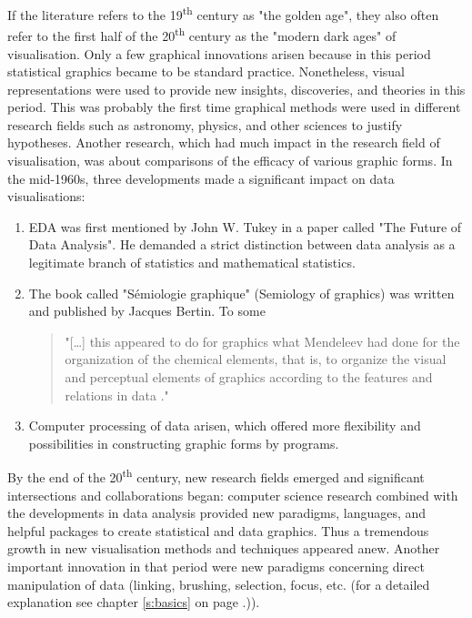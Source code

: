 If the literature refers to the 19\textsuperscript{th} century as "the golden age", they also often refer to the first half of the 20\textsuperscript{th} century as the "modern dark ages" of visualisation. Only a few graphical innovations arisen because in this period statistical graphics became to be standard practice. Nonetheless, visual representations were used to provide new insights, discoveries, and theories in this period. This was probably the first time graphical methods were used in different research fields such as astronomy, physics, and other sciences to justify hypotheses. Another research, which had much impact in the research field of visualisation, was about comparisons of the efficacy of various graphic forms. In the mid-1960s, three developments made a significant impact on data visualisations:
\begin{enumerate}
\item \ac{EDA} was first mentioned by John W. Tukey in a paper called "The Future of Data Analysis". He demanded a strict distinction between data analysis as a legitimate branch of statistics and mathematical statistics.
\item The book called "Sémiologie graphique" (Semiology of graphics) was written and published by Jacques Bertin. To some
\begin{quote}
"[\ldots] this appeared to do for graphics what Mendeleev had done for the organization of the chemical elements, that is, to organize the visual and perceptual elements of graphics according to the features and relations in data ."
\end{quote}
\label{crossref:bertain}
\item Computer processing of data arisen, which offered more flexibility and possibilities in constructing graphic forms by programs.
\end{enumerate}

By the end of the 20\textsuperscript{th} century, new research fields emerged and significant intersections and collaborations began: computer science research combined with the developments in data analysis provided new paradigms, languages, and helpful packages to create statistical and data graphics. Thus a tremendous growth in new visualisation methods and techniques appeared anew.
Another important innovation in that period were new paradigms  concerning direct manipulation of data (linking, brushing, selection, focus, etc. (for a detailed explanation see chapter \ref{s:basics} on page \pageref{s:basics}.)).